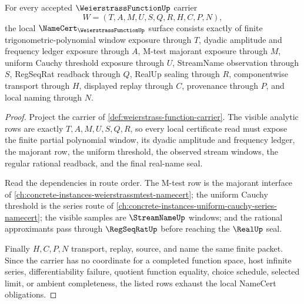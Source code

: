 \begin{theorem}
\label{thm:weierstrass-function-namecert-obligations}
For every accepted $\WeierstrassFunctionUp$ carrier
$$
W=(T,A,M,U,S,Q,R,H,C,P,N),
$$
the local $\NameCert_{\WeierstrassFunctionUp}$ surface consists exactly of finite trigonometric-polynomial window exposure through $T$, dyadic amplitude and frequency ledger exposure through $A$, M-test majorant exposure through $M$, uniform Cauchy threshold exposure through $U$, StreamName observation through $S$, RegSeqRat readback through $Q$, RealUp sealing through $R$, componentwise transport through $H$, displayed replay through $C$, provenance through $P$, and local naming through $N$.
\end{theorem}
\begin{proof}
Project the carrier of \autoref{def:weierstrass-function-carrier}. The visible analytic rows are exactly $T,A,M,U,S,Q,R$, so every local certificate read must expose the finite partial polynomial window, its dyadic amplitude and frequency ledger, the majorant row, the uniform threshold, the observed stream windows, the regular rational readback, and the final real-name seal.

Read the dependencies in route order. The M-test row is the majorant interface of \autoref{ch:concrete-instances-weierstrassmtest-namecert}; the uniform Cauchy threshold is the series route of \autoref{ch:concrete-instances-uniform-cauchy-series-namecert}; the visible samples are $\StreamNameUp$ windows; and the rational approximants pass through $\RegSeqRatUp$ before reaching the $\RealUp$ seal.

Finally $H,C,P,N$ transport, replay, source, and name the same finite packet. Since the carrier has no coordinate for a completed function space, host infinite series, differentiability failure, quotient function equality, choice schedule, selected limit, or ambient completeness, the listed rows exhaust the local NameCert obligations.
\end{proof}

